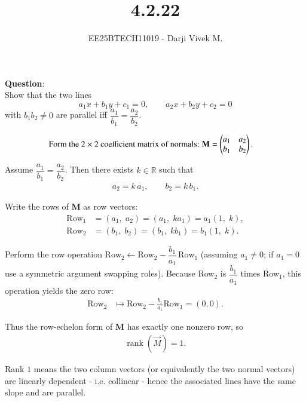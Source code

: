 \documentclass[journal]{IEEEtran}
\begin{document}


\title{4.2.22}
\author{EE25BTECH11019 - Darji Vivek M.}
{\let\newpage\relax\maketitle}

\renewcommand{\thefigure}{\theenumi}
\renewcommand{\thetable}{\theenumi}
\setlength{\intextsep}{10pt}
\renewcommand{\thetable}{\theenumi}
\textbf{Question}:\\
Show that the two lines
\[
a_1 x + b_1 y + c_1 = 0,\qquad a_2 x + b_2 y + c_2 = 0
\]
with \(b_1 b_2\neq 0\) are parallel iff \(\dfrac{a_1}{b_1}=\dfrac{a_2}{b_2}\).
\\
\solution

\begin{align}
&\text{Form the $2\times2$ coefficient matrix of normals: } 
\mathbf{M}=\begin{pmatrix}a_1 & a_2\\ b_1 & b_2\end{pmatrix}.
\end{align}

Assume \(\dfrac{a_1}{b_1}=\dfrac{a_2}{b_2}\). Then there exists \(k\in\mathbb{R}\) such that
\begin{align}
a_2 = k\,a_1,\qquad b_2 = k\,b_1.
\end{align}

Write the rows of \textbf{M} as row vectors:
\begin{align}
\text{Row}_1 &= (a_1,\;a_2) = (a_1,\;k a_1) = a_1(1,\;k),\\
\text{Row}_2 &= (b_1,\;b_2) = (b_1,\;k b_1) = b_1(1,\;k).
\end{align}

Perform the row operation \( \text{Row}_2 \leftarrow \text{Row}_2 - \dfrac{b_1}{a_1}\,\text{Row}_1\) (assuming \(a_1\neq0\); if \(a_1=0\) use a symmetric argument swapping roles). Because Row\(_2\) is \( \dfrac{b_1}{a_1}\) times Row\(_1\), this operation yields the zero row:
\begin{align}
\text{Row}_2 &\mapsto \text{Row}_2 - \frac{b_1}{a_1}\text{Row}_1 = (0,0).
\end{align}

Thus the row-echelon form of \textbf{M} has exactly one nonzero row, so
\begin{align}
\operatorname{rank}(\vec{M})=1.
\end{align}

Rank \(1\) means the two column vectors (or equivalently the two normal vectors) are linearly dependent - i.e. collinear - hence the associated lines have the same slope and are parallel.
\end{document}
